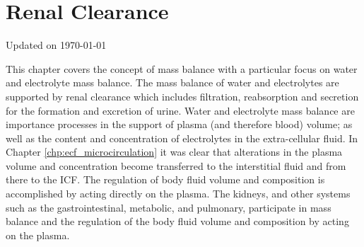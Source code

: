 \chapter{Renal Clearance}\label{chp:blood_content}
Updated on \today
\minitoc

This chapter covers the concept of mass balance with a particular focus on water and electrolyte mass balance. The mass balance of water and electrolytes are supported by renal clearance which includes filtration, reabsorption and secretion for the formation and excretion of urine. Water and electrolyte mass balance are importance processes in the support of plasma (and therefore blood) volume; as well as the content and concentration of electrolytes in the extra-cellular fluid. In Chapter \ref{chp:ecf_microcirculation} it was clear that alterations in the plasma volume and concentration become transferred to the interstitial fluid and from there to the ICF. The regulation of body fluid volume and composition is accomplished by acting directly on the plasma. The kidneys, and other systems such as the gastrointestinal, metabolic, and pulmonary, participate in mass balance and the regulation of the body fluid volume and composition by acting on the plasma.

\vspace{5mm}

